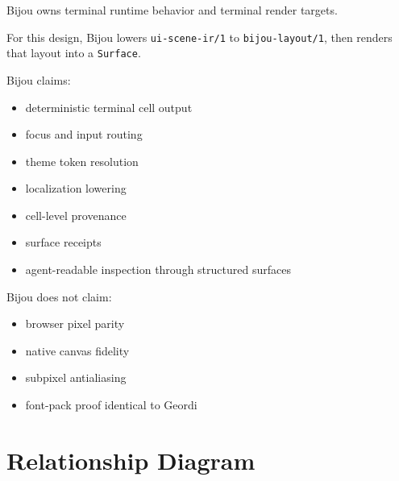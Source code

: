 Bijou owns terminal runtime behavior and terminal render targets.

For this design, Bijou lowers \texttt{u\allowbreak{}i\allowbreak{}-\allowbreak{}s\allowbreak{}c\allowbreak{}e\allowbreak{}n\allowbreak{}e\allowbreak{}-\allowbreak{}i\allowbreak{}r\allowbreak{}/\allowbreak{}1} to \texttt{b\allowbreak{}i\allowbreak{}j\allowbreak{}o\allowbreak{}u\allowbreak{}-\allowbreak{}l\allowbreak{}a\allowbreak{}y\allowbreak{}o\allowbreak{}u\allowbreak{}t\allowbreak{}/\allowbreak{}1}, then renders that layout into a \texttt{S\allowbreak{}u\allowbreak{}r\allowbreak{}f\allowbreak{}a\allowbreak{}c\allowbreak{}e}.

Bijou claims:

\begin{itemize}
\tightlist
\item
  deterministic terminal cell output
\item
  focus and input routing
\item
  theme token resolution
\item
  localization lowering
\item
  cell-level provenance
\item
  surface receipts
\item
  agent-readable inspection through structured surfaces
\end{itemize}

Bijou does not claim:

\begin{itemize}
\tightlist
\item
  browser pixel parity
\item
  native canvas fidelity
\item
  subpixel antialiasing
\item
  font-pack proof identical to Geordi
\end{itemize}

\section{Relationship Diagram}\label{record-138-relationship-diagram}

